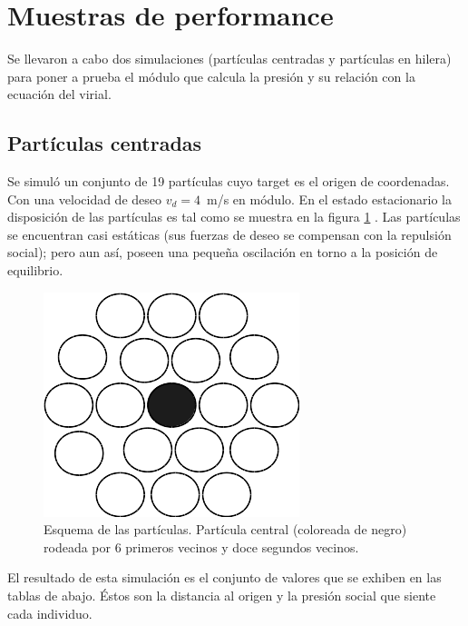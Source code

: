 \section{\label{Muestras de performace} Muestras de performance} 

Se llevaron a cabo dos simulaciones (partículas centradas y partículas en hilera) para poner a prueba el módulo que calcula la presión y su relación con la ecuación del virial. \\ 

\subsection{Partículas centradas}

Se simuló un conjunto de 19 partículas cuyo target es el origen de coordenadas. Con una velocidad de deseo $v_d=4$~m/s en módulo. En el estado estacionario la disposición de las partículas es tal como se muestra en la figura \ref{central} . Las partículas se encuentran casi estáticas (sus fuerzas de deseo se compensan con la repulsión social); pero aun así, poseen una pequeña oscilación en torno a la posición de equilibrio. 

\begin{figure}[H]
    \centering
        \includegraphics[scale=0.5]{figuras/central.png}
    \caption[width=5cm]{Esquema de las partículas. Partícula central (coloreada de negro) rodeada por 6 primeros vecinos y doce segundos vecinos.}
    \label{central}
\end{figure}


El resultado de esta simulación es el conjunto de valores que se exhiben en las tablas de abajo. Éstos son la distancia al origen y la presión social que siente cada individuo. 

